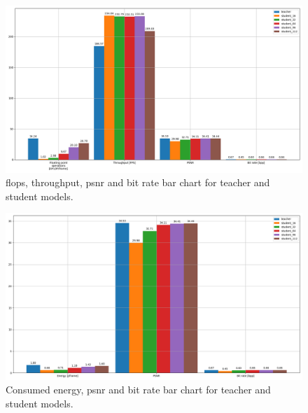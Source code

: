 \begin{figure}
    \centering
    \includegraphics[width=15cm]{../img/kd_lic_bar_compute.png}
    \caption[\acrshort{flop}s, throughput, \acrshort{psnr} and bit rate bar chart for teacher and student models.]{\acrshort{flop}s, throughput, \acrshort{psnr} and bit rate bar chart for teacher and student models.}
    \label{appendix:kd_lic_bar_compute}
\end{figure}

\begin{figure}
    \centering
    \includegraphics[width=15cm]{../img/kd_lic_bar_energy.png}
    \caption[Consumed energy, \acrshort{psnr} and bit rate bar chart for teacher and student models.]{Consumed energy, \acrshort{psnr} and bit rate bar chart for teacher and student models.}
    \label{appendix:kd_lic_bar_energy}
\end{figure}

